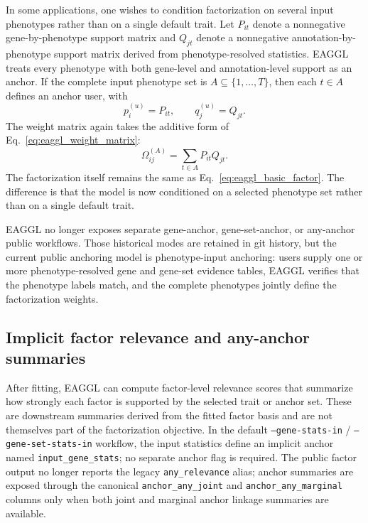 \documentclass[11pt]{article}
\begin{document}
In some applications, one wishes to condition factorization on several input phenotypes rather than on a single default trait. Let $P_{it}$ denote a nonnegative gene-by-phenotype support matrix and $Q_{jt}$ denote a nonnegative annotation-by-phenotype support matrix derived from phenotype-resolved statistics. EAGGL treats every phenotype with both gene-level and annotation-level support as an anchor. If the complete input phenotype set is $A \subseteq \{1,\ldots,T\}$, then each $t \in A$ defines an anchor user, with
\[
p_i^{(u)} = P_{it},
\qquad
q_j^{(u)} = Q_{jt}.
\]
The weight matrix again takes the additive form of Eq.~\eqref{eq:eaggl_weight_matrix}:
\begin{equation}
\Omega_{ij}^{(A)}
=
\sum_{t \in A}
P_{it} Q_{jt}.
\label{eq:eaggl_pheno_anchor_weights}
\end{equation}
The factorization itself remains the same as Eq.~\eqref{eq:eaggl_basic_factor}. The difference is that the model is now conditioned on a selected phenotype set rather than on a single default trait.

EAGGL no longer exposes separate gene-anchor, gene-set-anchor, or any-anchor public workflows. Those historical modes are retained in git history, but the current public anchoring model is phenotype-input anchoring: users supply one or more phenotype-resolved gene and gene-set evidence tables, EAGGL verifies that the phenotype labels match, and the complete phenotypes jointly define the factorization weights.

\subsection{Implicit factor relevance and any-anchor summaries}

After fitting, EAGGL can compute factor-level relevance scores that summarize how strongly each factor is supported by the selected trait or anchor set. These are downstream summaries derived from the fitted factor basis and are not themselves part of the factorization objective. In the default \texttt{--gene-stats-in} / \texttt{--gene-set-stats-in} workflow, the input statistics define an implicit anchor named \texttt{input\_gene\_stats}; no separate anchor flag is required. The public factor output no longer reports the legacy \texttt{any\_relevance} alias; anchor summaries are exposed through the canonical \texttt{anchor\_any\_joint} and \texttt{anchor\_any\_marginal} columns only when both joint and marginal anchor linkage summaries are available.
\end{document}
